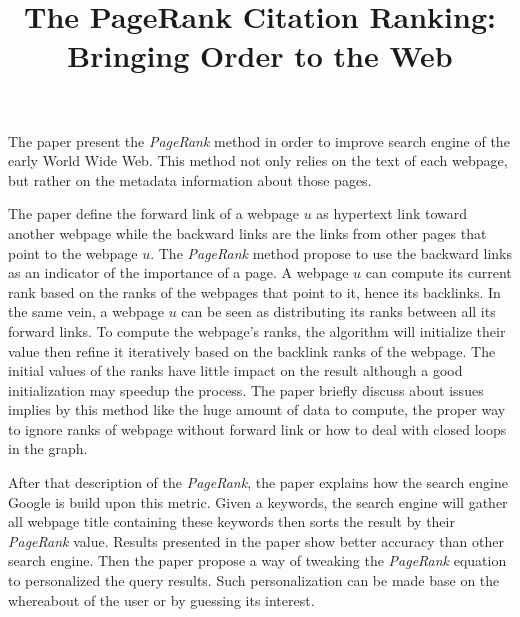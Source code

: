 \documentclass{article}
\title{The PageRank Citation Ranking: Bringing Order to the Web}
\begin{document}
\maketitle
The paper present the \textit{PageRank} method in
order to improve search engine of the early World
Wide Web. This method not only relies on the text
of each webpage, but rather on the metadata
information about those pages.

The paper define the forward link of a webpage $u$
as hypertext link toward another webpage while the
backward links are the links from other pages that
point to the webpage $u$. The \textit{PageRank}
method propose to use the backward links as an
indicator of the importance of a page.
A webpage $u$ can compute its current rank based
on the ranks of the webpages that point to it,
hence its backlinks. In the same vein, a webpage
$u$ can be seen as distributing its ranks between all
its forward links.
To compute the webpage's ranks, the algorithm
will initialize their value then refine
it iteratively based on the backlink ranks of the webpage. 
The initial values of the ranks have little
impact on the result although a good
initialization may speedup the process.
The paper briefly discuss about issues implies by
this method like the huge amount of data to
compute, the proper way to ignore ranks of
webpage without forward link or how to deal with
closed loops in the graph.

After that description of the \textit{PageRank},
the paper explains how the search engine Google is
build upon this metric. Given a keywords, the
search engine will gather all webpage title
containing these keywords then sorts the result by
their \textit{PageRank} value.
Results presented in the paper show better
accuracy than other search engine.
Then the paper propose a way of tweaking the
\textit{PageRank} equation to personalized the
query results. Such personalization can be made
base on the whereabout of the user or by guessing
its interest.

\end{document}
